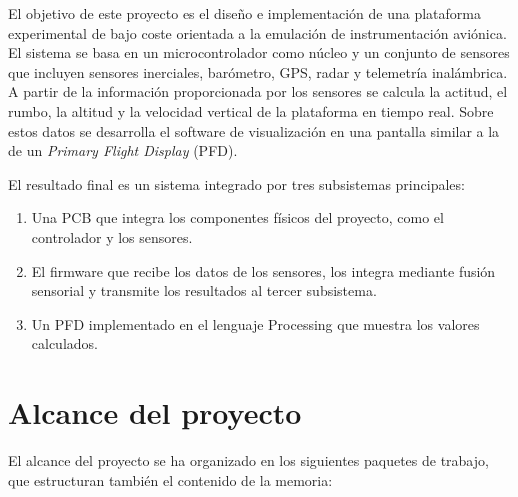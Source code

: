 El objetivo de este proyecto es el diseño e implementación de una plataforma
experimental de bajo coste orientada a la emulación de instrumentación
aviónica. El sistema se basa en un microcontrolador como núcleo y un
conjunto de sensores que incluyen sensores inerciales, barómetro, GPS, radar y
telemetría inalámbrica. A partir de la información proporcionada por los
sensores se calcula la actitud, el rumbo, la altitud y la velocidad vertical de
la plataforma en tiempo real. Sobre estos datos se desarrolla el software de
visualización en una pantalla similar a la de un \textit{Primary Flight Display}
(PFD).

El resultado final es un sistema integrado por tres subsistemas principales:

\begin{enumerate}
    \item Una PCB que integra los componentes físicos del proyecto, como el
    controlador y los sensores.
    \item El firmware que recibe los datos de los sensores, los integra mediante
    fusión sensorial y transmite los resultados al tercer subsistema.
    \item Un PFD implementado en el lenguaje Processing que muestra los valores
    calculados.
\end{enumerate}


\section{Alcance del proyecto}
\label{sec:alcance}

El alcance del proyecto se ha organizado en los siguientes paquetes de trabajo,
que estructuran también el contenido de la memoria:

